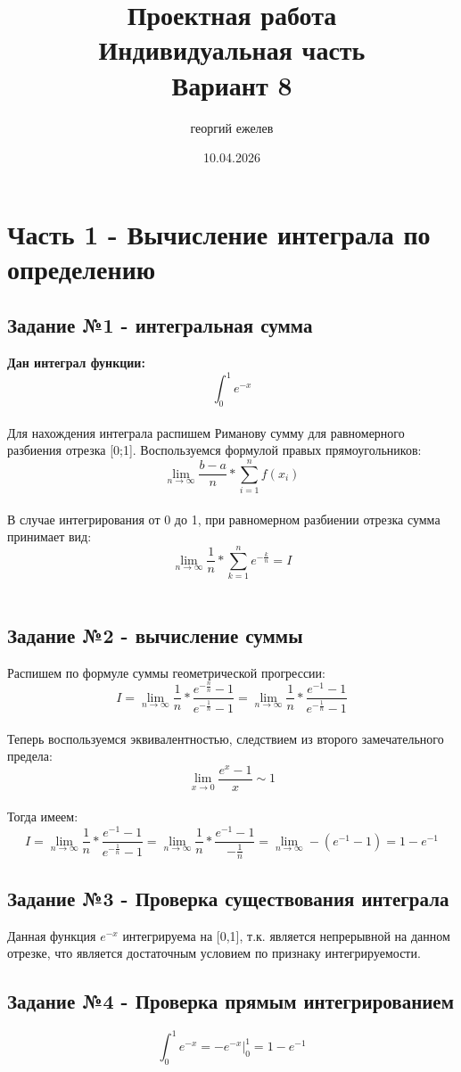 \documentclass{article}
\title{Проектная работа \\ Индивидуальная часть \\ Вариант 8}
\author{георгий ежелев}
\date{10.04.2026}
\begin{document}
	
	\maketitle
	
	\section{Часть 1 - Вычисление интеграла по определению}
	\subsection{Задание №1 - интегральная сумма}
	\textbf{Дан интеграл функции: } \[\int_{0}^{1}  e^{-x}\]\\
	Для нахождения интеграла распишем Риманову сумму для равномерного разбиения отрезка [0;1]. Воспользуемся формулой правых прямоугольников:\\
	\[\lim_{n \to \infty}\frac{b-a}{n}*\sum_{i=1}^{n}f(x_i)\]\\
	В случае интегрирования от 0 до 1, при равномерном разбиении отрезка сумма принимает вид:\\
	\[\lim_{n \to \infty} \frac{1}{n} * \sum_{k=1}^{n} e^{-\frac{k}{n}} = I\]\\
	\subsection{Задание №2 - вычисление суммы}
	Распишем по формуле суммы геометрической прогрессии:\\
	\[I = \lim_{n \to \infty} \frac{1}{n} * \frac{e^{-\frac{n}{n}} - 1 }{e^{-\frac{1}{n}} - 1} = \lim_{n \to \infty} \frac{1}{n} * \frac{e^{-1} - 1 }{e^{-\frac{1}{n}} - 1}\]\\
	Теперь воспользуемся эквивалентностью, следствием из второго замечательного предела:
	\[\lim_{x \to 0} \frac{e^{x} - 1}{x} \sim 1\]\\
	Тогда имеем:
	\[I = \lim_{n \to \infty} \frac{1}{n} * \frac{e^{-1} - 1 }{e^{-\frac{1}{n}} - 1} =\lim_{n \to \infty} \frac{1}{n} * \frac{e^{-1} - 1}{-\frac{1}{n}} = \lim_{n \to \infty} -(e^{-1} - 1) = \boxed{1 - e^{-1}}\]
	\subsection{Задание №3 - Проверка существования интеграла}
	Данная функция \(e^{-x}\) интегрируема на [0,1], т.к. является непрерывной на данном отрезке, что является достаточным условием по признаку интегрируемости.
	\subsection{Задание №4 - Проверка прямым интегрированием}
	\[\int_{0}^{1}  e^{-x} = -e^{-x}\Big\vert_{0}^{1} = \boxed{1 - e^{-1}}\]\\
\end{document}
